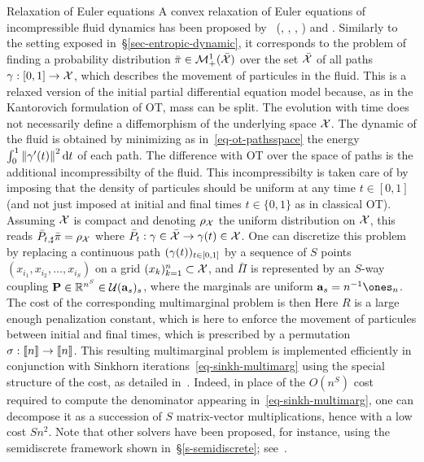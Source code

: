 \begin{rem2}{Relaxation of Euler equations}
A convex relaxation of Euler equations of incompressible fluid dynamics has been proposed by~\citeauthor{BrenierGeneralized} (\citeyear{BrenierEulerAMS}, \citeyear{BrenierEulerARMA}, \citeyear{BrenierEulerCPAM}, \citeyear{BrenierGeneralized}) and \citep{AmbrosioFigalliEuler}.
%
Similarly to the setting exposed in~\S\ref{sec-entropic-dynamic}, it corresponds to the problem of finding a probability distribution $\bar\pi \in \mathcal{M}_+^1(\bar{\mathcal{X}})$ over the set $\bar{\mathcal{X}}$ of all paths $\gamma : [0,1] \rightarrow \mathcal{X}$, which describes the movement of particules in the fluid.
%
This is a relaxed version of the initial partial differential equation model because, as in the Kantorovich formulation of OT, mass can be split. The evolution with time does not necessarily define a diffemorphism of the underlying space $\mathcal{X}$. 
%
The dynamic of the fluid is obtained by minimizing as in~\eqref{eq-ot-pathsspace} the energy $\int_0^1 \left\| \gamma'(t) \right\|^2 \mathrm{d} t$ of each path. 
%
The difference with OT over the space of paths is the additional incompressibilty of the fluid.
This incompressibilty is taken care of by imposing that the density of particules should be uniform at any time $t \in [0,1]$ (and not just imposed at initial and final times $t \in \{0,1\}$ as in classical OT). Assuming $\mathcal{X}$ is compact and denoting $\rho_{\mathcal{X}}$ the uniform distribution on $\mathcal{X}$, this reads $\bar P_{t,\sharp} \bar\pi = \rho_{\mathcal{X}}$ where $\bar P_t : \gamma \in \bar{\mathcal{X}} \rightarrow \gamma(t) \in \mathcal{X}$.
%
One can discretize this problem by replacing a continuous path $(\gamma(t))_{t \in [0,1]}$ by a sequence of $S$ points $(x_{i_1}, x_{i_2},\ldots,x_{i_S})$ on a grid $(x_k)_{k=1}^n \subset \mathcal{X}$, and $\bar\Pi$ is represented by an $S$-way coupling $\mathrm{\textbf{P}} \in \mathbb{R}^{n^S} \in \mathcal{U}(\mathrm{\textbf{a}}_s)_s$, where the marginals are uniform $\a_s=n^{-1} \ones_n$. 
%
The cost of the corresponding multimarginal problem is then
Here $R$ is a large enough penalization constant, which is here to enforce the movement of particules between initial and final times, which is prescribed by a permutation $\sigma : \llbracket n\rrbracket \rightarrow \llbracket n\rrbracket$.
%
This resulting multimarginal problem is implemented efficiently in conjunction with Sinkhorn iterations~\eqref{eq-sinkh-multimarg} using the special structure of the cost, as detailed in~\citep{2015-benamou-cisc}.
%
Indeed, in place of the $O(n^S)$ cost required to compute the denominator appearing in~\eqref{eq-sinkh-multimarg}, one can decompose it as a succession of $S$ matrix-vector multiplications, hence with a low cost $Sn^2$.
%
Note that other solvers have been proposed, for instance, using the semidiscrete framework shown in~\S\ref{s-semidiscrete}; see~\citep{deGoes2015,gallouet2017lagrangian}.
\end{rem2}


